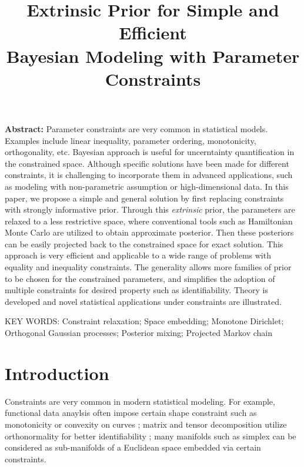 \documentclass[10pt]{article}
\title{\textbf{Extrinsic Prior for Simple and Efficient\\ Bayesian Modeling with Parameter Constraints}}
\date{}
\begin{document}
\maketitle


{\bf Abstract:} Parameter constraints are very common in statistical models. Examples include linear inequality, parameter ordering, monotonicity, orthogonality, etc. Bayesian approach is useful for uncerntainty quantification in the constrained space. Although specific solutions have been made for different constraints, it is challenging to incorporate them in advanced applications, such as modeling with non-parametric assumption or high-dimensional data. In this paper, we propose a simple and general solution by first replacing constraints with strongly informative prior. Through this {\it extrinsic} prior, the parameters are relaxed to a less restrictive space, where conventional tools such as Hamiltonian Monte Carlo are utilized to obtain approximate posterior. Then these posteriors can be easily projected back to the constrained space for exact solution. This approach is very efficient and applicable to a wide range of problems with equality and inequality constraints. The generality allows more families of prior to be chosen for the constrained parameters, and simplifies the adoption of multiple constraints for desired property such as identifiability. Theory is developed and novel statistical applications under constraints are illustrated.
\vskip 12pt

{\noindent  KEY WORDS:  Constraint relaxation; Space embedding; Monotone Dirichlet; Orthogonal Gaussian processes; Posterior mixing; Projected Markov chain}
{}

\section{Introduction}

Constraints are very common in modern statistical modeling. For example, functional data anaylsis often impose certain shape constraint such as monotonicity or convexity on curves \citep{kelly1990monotone}; matrix and tensor decomposition utilize orthonormality for better identifiability \citep{uschmajew2010well}; many manifolds such as simplex can be considered as sub-manifolds of a Euclidean space embedded via certain constraints.
\end{document}
